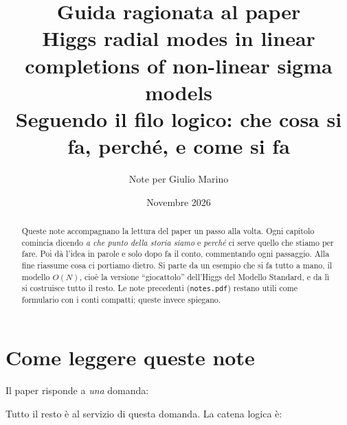 \documentclass[11pt,a4paper]{article}
\title{\textbf{Guida ragionata al paper}\\[4pt]\Large Higgs radial modes in linear completions of non-linear sigma models\\[6pt]
\normalsize Seguendo il filo logico: che cosa si fa, perché, e come si fa}
\author{Note per Giulio Marino}
\date{Novembre 2026}
\numberwithin{equation}{section}
\theoremstyle{remark}
\begin{document}
\maketitle

\begin{abstract}
Queste note accompagnano la lettura del paper un passo alla volta. Ogni capitolo comincia dicendo \emph{a che punto della storia siamo} e \emph{perché} ci serve quello che stiamo per fare. Poi dà l'idea in parole e solo dopo fa il conto, commentando ogni passaggio. Alla fine riassume cosa ci portiamo dietro. Si parte da un esempio che si fa tutto a mano, il modello $O(N)$, cioè la versione ``giocattolo'' dell'Higgs del Modello Standard, e da lì si costruisce tutto il resto. Le note precedenti (\texttt{notes.pdf}) restano utili come formulario con i conti compatti; queste invece spiegano.
\end{abstract}

\tableofcontents
\newpage

\section{Come leggere queste note}

Il paper risponde a \emph{una} domanda:
\begin{center}
\end{center}
Tutto il resto è al servizio di questa domanda. La catena logica è:
\end{document}
